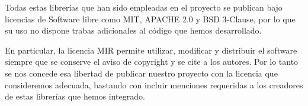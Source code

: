 Todas estas librerías que han sido empleadas en el proyecto se publican bajo licencias de Software libre como MIT, APACHE 2.0 y BSD 3-Clause, por lo que su uso no dispone trabas adicionales al código que hemos desarrollado.

En particular, la licencia MIR permite utilizar, modificar y distribuir el software siempre que se conserve el aviso de copyright y se cite a los autores. Por lo tanto se nos concede esa libertad de publicar nuestro proyecto con la licencia que consideremos adecuada, bastando con incluir menciones requeridas a los creadores de estas librerías que hemos integrado.


